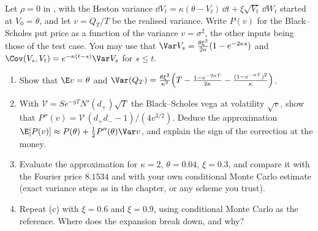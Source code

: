 \begin{exercise}\label{ex:st-hull-white}
\hard Let $\rho=0$ in , with the Heston variance
$\dd V_t=\kappa(\theta-V_t)\,\dd t+\xi\sqrt{V_t}\,\dd W_t$ started at $V_0=\theta$, and let
$v=Q_T/T$ be the realised variance. Write $P(v)$ for the Black--Scholes put price as a function
of the variance $v=\sigma^2$, the other inputs being those of the test case. You may use that
$\Var V_s=\frac{\theta\xi^2}{2\kappa}(1-e^{-2\kappa s})$ and
$\Cov(V_s,V_t)=e^{-\kappa(t-s)}\Var V_s$ for $s\le t$.
\begin{enumerate}[label=(\alph*)]
  \item Show that $\E v=\theta$ and
    $\Var(Q_T)=\frac{\theta\xi^2}{\kappa^2}\Big(T-\frac{1-e^{-2\kappa T}}{2\kappa}-\frac{(1-e^{-\kappa T})^2}{\kappa}\Big)$.
  \item With $\mathcal V=Se^{-yT}N'(d_+)\sqrt T$ the Black--Scholes vega at volatility $\sqrt v$,
    show that $P''(v)=\mathcal V\,(d_+d_--1)/(4v^{3/2})$. Deduce the approximation
    $\E[P(v)]\approx P(\theta)+\frac12P''(\theta)\Var v$, and explain the sign of the correction
    at the money.
  \item Evaluate the approximation for $\kappa=2$, $\theta=0.04$, $\xi=0.3$, and compare it with
    the Fourier price $8.1534$ and with your own conditional Monte Carlo estimate (exact variance
    steps as in the chapter, or any scheme you trust).
  \item Repeat (c) with $\xi=0.6$ and $\xi=0.9$, using conditional Monte Carlo as the reference.
    Where does the expansion break down, and why?
\end{enumerate}
\end{exercise}
